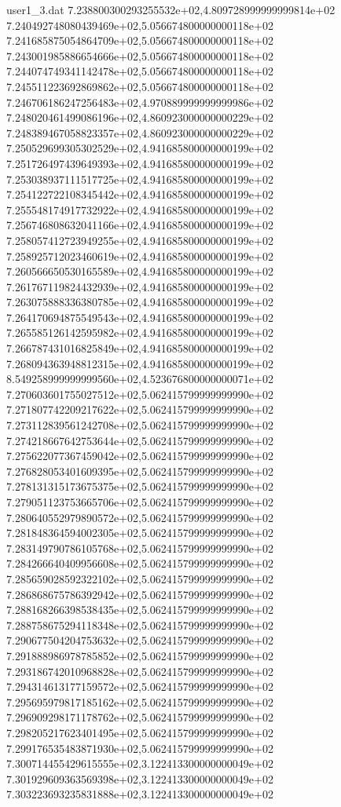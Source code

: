 \begin{filecontents}{user1_3.dat}
7.238800300293255532e+02,4.809728999999999814e+02
7.240492748080439469e+02,5.056674800000000118e+02
7.241685875054864709e+02,5.056674800000000118e+02
7.243001985886654666e+02,5.056674800000000118e+02
7.244074749341142478e+02,5.056674800000000118e+02
7.245511223692869862e+02,5.056674800000000118e+02
7.246706186247256483e+02,4.970889999999999986e+02
7.248020461499086196e+02,4.860923000000000229e+02
7.248389467058823357e+02,4.860923000000000229e+02
7.250529699305302529e+02,4.941685800000000199e+02
7.251726497439649393e+02,4.941685800000000199e+02
7.253038937111517725e+02,4.941685800000000199e+02
7.254122722108345442e+02,4.941685800000000199e+02
7.255548174917732922e+02,4.941685800000000199e+02
7.256746808632041166e+02,4.941685800000000199e+02
7.258057412723949255e+02,4.941685800000000199e+02
7.258925712023460619e+02,4.941685800000000199e+02
7.260566650530165589e+02,4.941685800000000199e+02
7.261767119824432939e+02,4.941685800000000199e+02
7.263075888336380785e+02,4.941685800000000199e+02
7.264170694875549543e+02,4.941685800000000199e+02
7.265585126142595982e+02,4.941685800000000199e+02
7.266787431016825849e+02,4.941685800000000199e+02
7.268094363948812315e+02,4.941685800000000199e+02
8.549258999999999560e+02,4.523676800000000071e+02
7.270603601755027512e+02,5.062415799999999990e+02
7.271807742209217622e+02,5.062415799999999990e+02
7.273112839561242708e+02,5.062415799999999990e+02
7.274218667642753644e+02,5.062415799999999990e+02
7.275622077367459042e+02,5.062415799999999990e+02
7.276828053401609395e+02,5.062415799999999990e+02
7.278131315173675375e+02,5.062415799999999990e+02
7.279051123753665706e+02,5.062415799999999990e+02
7.280640552979890572e+02,5.062415799999999990e+02
7.281848364594002305e+02,5.062415799999999990e+02
7.283149790786105768e+02,5.062415799999999990e+02
7.284266640409956608e+02,5.062415799999999990e+02
7.285659028592322102e+02,5.062415799999999990e+02
7.286868675786392942e+02,5.062415799999999990e+02
7.288168266398538435e+02,5.062415799999999990e+02
7.288758675294118348e+02,5.062415799999999990e+02
7.290677504204753632e+02,5.062415799999999990e+02
7.291888986978785852e+02,5.062415799999999990e+02
7.293186742010968828e+02,5.062415799999999990e+02
7.294314613177159572e+02,5.062415799999999990e+02
7.295695979817185162e+02,5.062415799999999990e+02
7.296909298171178762e+02,5.062415799999999990e+02
7.298205217623401495e+02,5.062415799999999990e+02
7.299176535483871930e+02,5.062415799999999990e+02
7.300714455429615555e+02,3.122413300000000049e+02
7.301929609363569398e+02,3.122413300000000049e+02
7.303223693235831888e+02,3.122413300000000049e+02

\end{filecontents}
